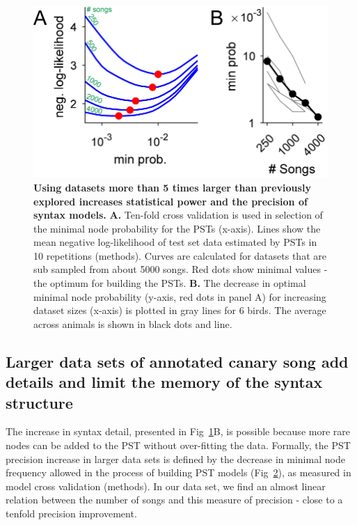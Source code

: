 \documentclass[10pt,letterpaper]{article}
\begin{document}
\begin{figure}[!ht]
\label{fig_automatic_canary_syntax}
\end{figure}


\begin{figure}[!ht]
\includegraphics[scale=1.0]{figures/mainfig_accuracy_in_large_datasets/mainfig_accuracy_in_large_datasets.png}
\caption{{\bf Using datasets more than 5 times larger than previously explored increases statistical power and the precision of syntax models.}
\textbf{A.} Ten-fold cross validation is used in selection of the minimal node probability for the PSTs (x-axis). Lines show the mean negative log-likelihood of test set data estimated by PSTs in 10 repetitions (methods). Curves are calculated for datasets that are sub sampled from about 5000 songs. Red dots show minimal values - the optimum for building the PSTs.
\textbf{B.} The decrease in optimal minimal node probability (y-axis, red dots in panel A) for increasing dataset sizes (x-axis) is plotted in gray lines for 6 birds. The average across animals is shown in black dots and line.}
\label{fig_precision_in_large_datasets}
\end{figure}

\subsection*{Larger data sets of annotated canary song add details and limit the memory of the syntax structure}
The increase in syntax detail, presented in Fig~\ref{fig_automatic_canary_syntax}B, is possible because more rare nodes can be added to the PST without over-fitting the data. Formally, the PST precision increase in larger data sets is defined by the decrease in minimal node frequency allowed in the process of building PST models (Fig~\ref{fig_precision_in_large_datasets}), as measured in model cross validation (methods). In our data set, we find an almost linear relation between the number of songs and this measure of precision - close to a tenfold precision improvement.
\end{document}
